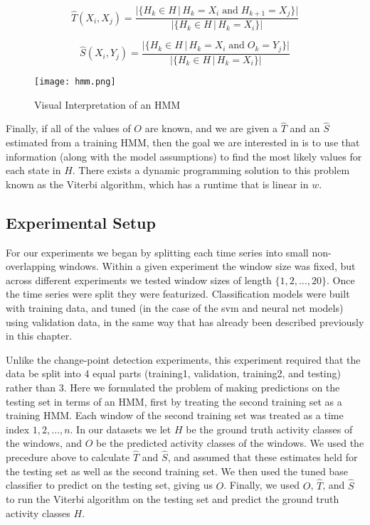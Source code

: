 \[
\hat{T}(X_i,X_j) = \frac{|\{H_k \in H \, | \, H_k=X_i \; \text{and} \; H_{k+1}=X_j\}|} {|\{H_k \in H \, | \, H_k=X_i\}|}
\]

\[
\hat{S}(X_i,Y_j) = \frac{|\{H_k \in H \, | \, H_k=X_i \; \text{and} \; O_k=Y_j\}|} {|\{H_k \in H \, | \, H_k=X_i\}|}
\]

\begin{figure}
 \centering
 \texttt{[image: hmm.png]}
 \caption{Visual Interpretation of an HMM}
 \label{fig:hmm}
\end{figure}

Finally, if all of the values of $O$ are known, and we are given
a $\hat{T}$ and an $\hat{S}$ estimated from a training HMM, then the goal we are interested in
is to use that information (along with the model assumptions)
to find the most likely values for each state in $H$. There
exists a dynamic programming solution to this problem known as the Viterbi
algorithm, which has a runtime that is linear in $w$. \cite{russell10}

\subsection{Experimental Setup}

For our experiments we began by splitting each time series into small non-overlapping windows. Within a
given experiment the window size was fixed, but across different experiments we
tested window sizes of length $\{1,2, \ldots ,20\}$. Once the time series were
split they were featurized. Classification
models were built with training data,
and tuned (in the case of the svm and neural net models) using validation data,
in the same way that has already been described previously in this chapter.

Unlike the change-point detection experiments, this experiment required
that the data be split into 4 equal parts (training1, validation, training2,
and testing) rather than 3. 
Here we formulated the problem of making predictions on the testing set in terms
of an HMM, first by treating the second training set as a training HMM. Each
window of the second training set was treated as a time index ${1,2, \ldots, n}$.
In our datasets we
let $H$ be the ground truth activity classes of the windows, and $O$ be the
predicted activity classes of the windows. We used the precedure above to
calculate $\hat{T}$ and $\hat{S}$, and assumed that these estimates held for
the testing set as well as the second training set. We then used the
tuned base classifier to predict on the testing set, giving us $O$. Finally,
we used $O$, $\hat{T}$, and $\hat{S}$ to run the Viterbi algorithm on the
testing set and predict the ground truth activity classes $H$.
